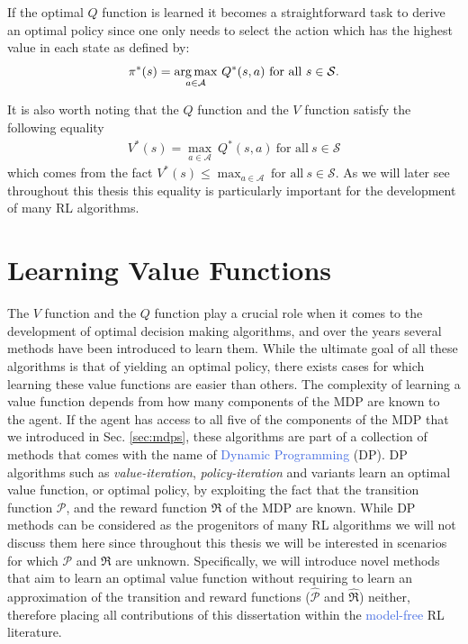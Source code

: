 If the optimal $Q$ function is learned it becomes a straightforward task to derive an optimal policy since one only needs to select the action which has the highest value in each state as defined by:
\begin{equation}
	\pi^{*}(s) = \underset{a\in\mathcal{A}}{\operatorname*{arg\,max}} \ Q^{*}(s,a) \ \text{for all} \ s \in \mathcal{S}.
\end{equation}

It is also worth noting that the $Q$ function and the $V$ function satisfy the following equality
\begin{align}
	V^{*}(s) = \underset{a\in\mathcal{A}}{\max} \ Q^{*}(s,a) \ \text{for all} \ s \in \mathcal{S}
\end{align}
which comes from the fact $V^{*}(s) \leq \max_{a\in\mathcal{A}} \ \text{for all} \ s\in\mathcal{S}$. As we will later see throughout this thesis this equality is particularly important for the development of many RL algorithms.


\section{Learning Value Functions}
The $V$ function and the $Q$ function play a crucial role when it comes to the development of optimal decision making algorithms, and over the years several methods have been introduced to learn them. While the ultimate goal of all these algorithms is that of yielding an optimal policy, there exists cases for which learning these value functions are easier than others. The complexity of learning a value function depends from how many components of the MDP are known to the agent. If the agent has access to all five of the components of the MDP that we introduced in Sec. \ref{sec:mdps}, these algorithms are part of a collection of methods that comes with the name of \textcolor{RoyalBlue}{Dynamic Programming} (DP). DP algorithms such as \textit{value-iteration}, \textit{policy-iteration} and variants \cite{bertsekas2015value,wei2015value} learn an optimal value function, or optimal policy, by exploiting the fact that the transition function $\mathcal{P}$, and the reward function $\Re$ of the MDP are known. While DP methods can be considered as the progenitors of many RL algorithms we will not discuss them here since throughout this thesis we will be interested in scenarios for which $\mathcal{P}$ and $\Re$ are unknown. Specifically, we will introduce novel methods that aim to learn an optimal value function without requiring to learn an approximation of the transition and reward functions ($\widehat{\mathcal{P}}$ and $\widehat{\mathcal{\Re}}$) neither, therefore placing all contributions of this dissertation within the \textcolor{RoyalBlue}{model-free} RL literature. 

